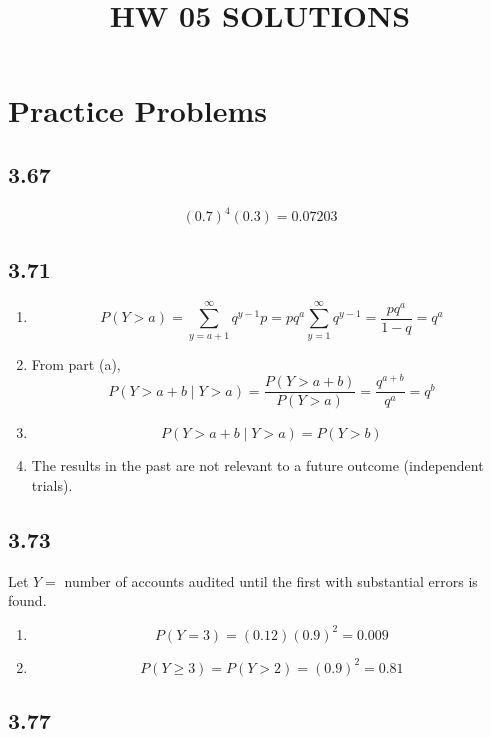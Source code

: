 \documentclass[
  letterpaper,
  DIV=11,
  numbers=noendperiod]{scrartcl}
\title{HW 05 SOLUTIONS}
\author{}
\date{}
\begin{document}
\maketitle


\section{Practice Problems}\label{practice-problems}

\subsection{3.67}\label{section}

\[(0.7)^4 (0.3) = 0.07203\]

\subsection{3.71}\label{section-1}

\begin{enumerate}
\def\labelenumi{(\alph{enumi})}
\item
  \[P(Y > a) = \sum_{y = a + 1}^{\infty} q^{y-1}p = pq^a\sum_{y = 1}^{\infty} q^{y-1} = \frac{pq^a}{1 - q} = q^a\]
\item
  From part (a),
  \[P(Y > a+b \mid Y > a) = \frac{P(Y > a+b)}{P(Y > a)} = \frac{q^{a+b}}{q^a} = q^b\]
\item
  \[P(Y > a+b \mid Y > a) = P(Y > b)\]
\item
  The results in the past are not relevant to a future outcome
  (independent trials).
\end{enumerate}

\subsection{3.73}\label{section-2}

Let \(Y =\) number of accounts audited until the first with substantial
errors is found.

\begin{enumerate}
\def\labelenumi{(\alph{enumi})}
\item
  \[P(Y = 3) = (0.12)(0.9)^2 = 0.009\]
\item
  \[P(Y \geq 3) = P(Y > 2) = (0.9)^2 = 0.81\]
\end{enumerate}

\subsection{3.77}\label{section-3}
\end{document}
